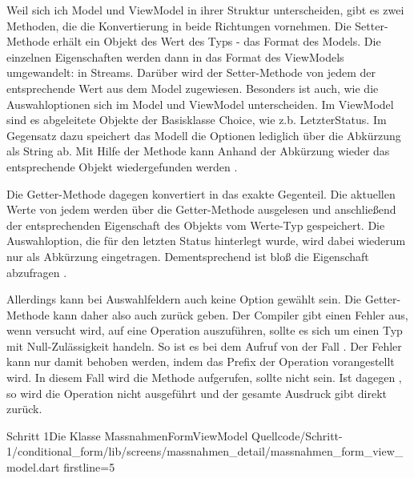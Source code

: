 Weil sich ich Model und ViewModel in ihrer Struktur unterscheiden, gibt es zwei Methoden, die die Konvertierung in beide Richtungen vornehmen.
Die Setter-Methode   erhält ein Objekt des Wert des Typs  - das Format des Models.
Die einzelnen Eigenschaften werden dann in das Format des ViewModels umgewandelt: in Streams.
Darüber wird der Setter-Methode  von jedem  der entsprechende Wert aus dem Model zugewiesen.
Besonders ist auch, wie die Auswahloptionen sich im Model und ViewModel unterscheiden.  Im ViewModel sind es abgeleitete Objekte der Basisklasse Choice, wie z.b. LetzterStatus.  Im Gegensatz dazu speichert das Modell die Optionen lediglich über die Abkürzung als String ab. Mit Hilfe der Methode  kann Anhand der Abkürzung wieder das entsprechende Objekt wiedergefunden werden .

Die Getter-Methode dagegen konvertiert in das exakte Gegenteil.
Die aktuellen Werte von jedem  werden über die Getter-Methode  ausgelesen und anschließend der entsprechenden Eigenschaft des Objekts vom Werte-Typ  gespeichert.
Die Auswahloption, die für den letzten Status hinterlegt wurde, wird dabei wiederum nur als Abkürzung eingetragen.
Dementsprechend ist bloß die Eigenschaft  abzufragen .

Allerdings kann bei Auswahlfeldern auch keine Option gewählt sein.
Die Getter-Methode  kann daher also auch  zurück geben.
Der Compiler gibt einen Fehler aus, wenn versucht wird, auf  eine Operation auszuführen, sollte es sich um einen Typ mit Null-Zulässigkeit handeln.
So ist es bei dem Aufruf von  der Fall .
Der Fehler kann nur damit behoben werden, indem das Prefix   der Operation vorangestellt wird.
In diesem Fall wird die Methode aufgerufen, sollte  nicht  sein.
Ist  dagegen , so wird die Operation nicht ausgeführt und der gesamte Ausdruck gibt direkt  zurück.

\begin{alexlisting}{Schritt 1}{Die Klasse MassnahmenFormViewModel}
  {Quellcode/Schritt-1/conditional_form/lib/screens/massnahmen_detail/massnahmen_form_view_model.dart}
  {firstline=5}
  \label{lst:Schritt1KlasseMassnahmenFormViewModel}
\end{alexlisting}

